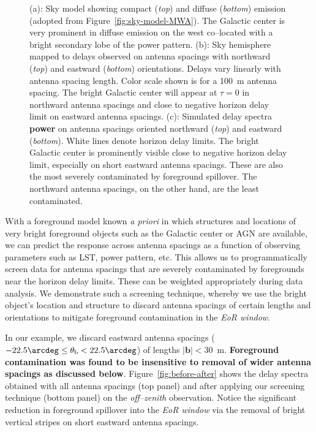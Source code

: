 \documentclass[preprint2,iop,numberedappendix]{emulateapj}
\begin{document}
\begin{figure}[htb]
\caption{(a): Sky model showing compact ({\it top}) and diffuse ({\it bottom}) emission (adopted from Figure~\ref{fig:sky-model-MWA}). The Galactic center is very prominent in diffuse emission on the west co--located with a bright secondary lobe of the power pattern. (b): Sky hemisphere mapped to delays observed on antenna spacings with northward ({\it top}) and eastward ({\it bottom}) orientations. Delays vary linearly with antenna spacing length. Color scale shown is for a 100~m antenna spacing. The bright Galactic center will appear at $\tau=0$ in northward antenna spacings and close to negative horizon delay limit on eastward antenna spacings. (c): Simulated delay spectra {\bf power} on antenna spacings oriented northward ({\it top}) and eastward ({\it bottom}). White lines denote horizon delay limits. The bright Galactic center is prominently visible close to negative horizon delay limit, especially on short eastward antenna spacings. These are also the most severely contaminated by foreground spillover. The northward antenna spacings, on the other hand, are the least contaminated.}
\label{fig:breakup}
\end{figure}

With a foreground model known {\it a priori} in which structures and locations of very bright foreground objects such as the Galactic center or AGN are available, we can predict the response across antenna spacings as a function of observing parameters such as LST, power pattern, etc. This allows us to programmatically screen data for antenna spacings that are severely contaminated by foregrounds near the horizon delay limits. These can be weighted appropriately during data analysis. We demonstrate such a screening technique, whereby we use the bright object's location and structure to discard antenna spacings of certain lengths and orientations to mitigate foreground contamination in the {\it EoR window}. 

In our example, we discard eastward antenna spacings ($-22.5\arcdeg\le\theta_\textrm{b}< 22.5\arcdeg$) of lengths $|\boldsymbol{b}| < 30$~m. {\bf Foreground contamination was found to be insensitive to removal of wider antenna spacings as discussed below}. Figure~\ref{fig:before-after} shows the delay spectra obtained with all antenna spacings (top panel) and after applying our screening technique (bottom panel) on the {\it off--zenith} observation. Notice the significant reduction in foreground spillover into the {\it EoR window} via the removal of bright vertical stripes on short eastward antenna spacings. 
\end{document}
